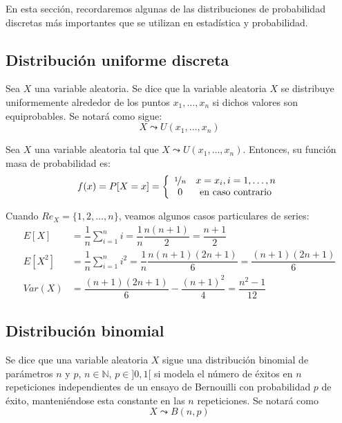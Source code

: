 \noindent
En esta sección, recordaremos algunas de las distribuciones de probabilidad discretas más importantes que se utilizan en estadística y probabilidad.

\subsection{Distribución uniforme discreta}

\begin{definicion}
    Sea $X$ una variable aleatoria. Se dice que la variable aleatoria $X$ se distribuye uniformemente alrededor de los puntos $x_1,\dots, x_n$ si dichos valores son equiprobables.
    \noindent
    Se notará como sigue:
    \begin{equation*}
        X \leadsto U(x_1,\dots, x_n)
    \end{equation*}
\end{definicion}

\begin{prop}
    Sea $X$ una variable aleatoria tal que $X\leadsto U(x_1,\dots, x_n)$. Entonces, su función masa de probabilidad es:
    \begin{equation*}
        f(x) = P[X=x] = \left\{\begin{array}{cc}
            \nicefrac{1}{n} & x=x_i, i=1,\dots, n \\
            0 & \text{en caso contrario}
        \end{array}\right.
    \end{equation*}
\end{prop}

\noindent
Cuando $Re_X = \{1, 2, \ldots, n\}$, veamos algunos casos particulares de series:
\begin{equation*}
    \begin{split}
        E[X] &= \dfrac{1}{n}\sum_{i=1}^n i = \dfrac{1}{n}\dfrac{n(n+1)}{2} = \dfrac{n+1}{2}\\
        E[X^2] &= \dfrac{1}{n}\sum_{i=1}^n i^2 = \dfrac{1}{n}\dfrac{n(n+1)(2n+1)}{6} = \dfrac{(n+1)(2n+1)}{6}\\
        Var(X) &= \dfrac{(n+1)(2n+1)}{6} - \dfrac{(n+1)^2}{4} = \dfrac{n^2-1}{12}
    \end{split}
\end{equation*}


\subsection{Distribución binomial}
\begin{definicion}
    Se dice que una variable aleatoria $X$ sigue una distribución binomial de parámetros $n$ y $p$, $n\in \mathbb{N}$, $p\in ]0,1[$ si modela el número de éxitos en $n$ repeticiones independientes de un ensayo de Bernouilli con probabilidad $p$ de éxito, manteniéndose esta constante en las $n$ repeticiones. Se notará como $$X\leadsto B(n,p)$$
\end{definicion}

